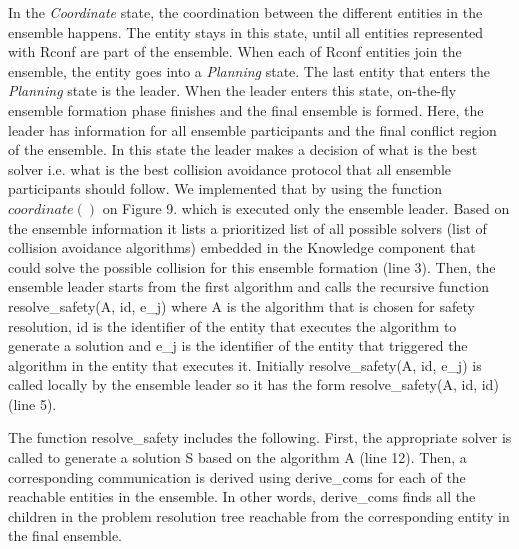 \documentclass[journal]{IEEEtran}
\theoremstyle{definition}
\begin{document}
In the \textit{Coordinate} state, 
the coordination between the different entities in the ensemble happens.  The entity stays in this state, until all entities represented with Rconf are part of the ensemble. 
When each of Rconf entities join the ensemble, the entity
goes into a \textit{Planning} state. The last entity that enters the \textit{Planning} state is the leader. When the leader enters this state,  on-the-fly ensemble formation phase finishes and the final ensemble is formed. 
Here, the leader has information for all ensemble participants and the final conflict region of the ensemble.
In this state the leader makes a decision of what is the best solver i.e.  what is the best collision avoidance protocol that all ensemble participants should follow. We implemented that by using the function $coordinate()$ on Figure 9. which is executed only the ensemble leader. Based on the ensemble information it
lists a prioritized list of all possible solvers (list of collision avoidance algorithms) embedded in the Knowledge component that could solve the possible collision for this ensemble formation (line 3). 
Then, the ensemble leader starts from the first algorithm and calls the recursive function resolve\_safety(A, id, e\_j) where A is the algorithm that is chosen for safety resolution, id is the identifier of the entity that executes the algorithm to generate a solution and e\_j is the identifier of the entity that triggered the algorithm in the entity that executes it. 
Initially resolve\_safety(A, id, e\_j) is called locally by the ensemble leader so it has the form resolve\_safety(A, id, id) (line 5).

The function resolve\_safety includes the following.
First, the appropriate solver is called to generate a solution S based on the algorithm A (line 12). 
Then, a corresponding communication is derived using derive\_coms for each of the reachable entities in the ensemble. In other words, derive\_coms finds all the children in the problem resolution tree reachable from the corresponding entity in the final ensemble.
\end{document}
